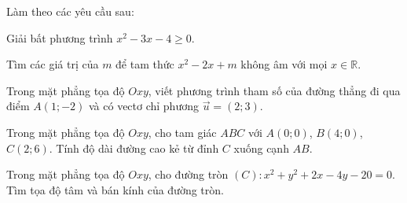 
\NQuestion Làm theo các yêu cầu sau: 
\begin{SubQuestions}
\item Giải bất phương trình $x^2-3x-4\ge 0$.
\item Tìm các giá trị của $m$ để tam thức $x^2-2x+m$ không âm với mọi $x\in\mathbb R$.
\end{SubQuestions}

\NQuestion Trong mặt phẳng tọa độ $Oxy$, viết phương trình tham số của đường thẳng đi qua điểm $A(1;-2)$ và có vectơ chỉ phương $\vec u=(2;3)$.

\NQuestion Trong mặt phẳng tọa độ $Oxy$, cho tam giác $ABC$ với $A(0;0)$, $B(4;0)$, $C(2;6)$. Tính độ dài đường cao kẻ từ đỉnh $C$ xuống cạnh $AB$.

\NQuestion Trong mặt phẳng tọa độ $Oxy$, cho đường tròn $(C):x^2+y^2+2x-4y-20=0$. Tìm tọa độ tâm và bán kính của đường tròn.

